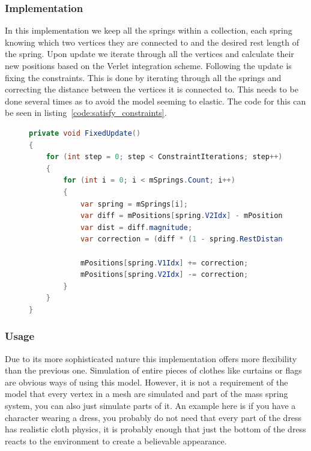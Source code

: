 \subsubsection{Implementation}
In this implementation we keep all the springs within a collection, each spring knowing which two vertices they are connected to and the desired rest length of the spring.
Upon update we iterate through all the vertices and calculate their new positions based on the Verlet integration scheme.
Following the update is fixing the constraints. This is done by iterating through all the springs and correcting the distance between the vertices it is connected to.
This needs to be done several times as to avoid the model seeming to elastic.
The code for this can be seen in listing~\ref{code:satisfy_constraints}.

\begin{figure}
\begin{lstlisting}[label={code:satisfy_constraints},language=csharp,caption={Semi-Implicit Euler Integration}]
private void FixedUpdate()
{
    for (int step = 0; step < ConstraintIterations; step++)
    {
        for (int i = 0; i < mSprings.Count; i++)
        {
            var spring = mSprings[i];
            var diff = mPositions[spring.V2Idx] - mPositions[spring.V1Idx];
            var dist = diff.magnitude;
            var correction = (diff * (1 - spring.RestDistance / dist)) * 0.5f;

            mPositions[spring.V1Idx] += correction;
            mPositions[spring.V2Idx] -= correction;
        }
    }
}
\end{lstlisting}
\end{figure}

\subsubsection{Usage}
Due to its more sophisticated nature this implementation offers more flexibility than the previous one.
Simulation of entire pieces of clothes like curtains or flags are obvious ways of using this model.
However, it is not a requirement of the model that every vertex in a mesh are simulated and part of the mass spring system, you can also just simulate parts of it.
An example here is if you have a character wearing a dress, you probably do not need that every part of the dress
has realistic cloth physics, it is probably enough that just the bottom of the dress reacts to the environment
to create a believable appearance.


